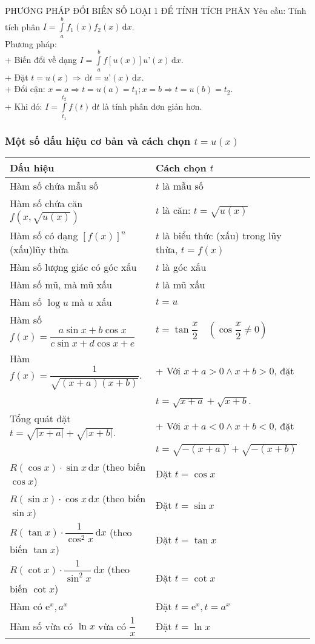 \begin{dang}{PHƯƠNG PHÁP ĐỔI BIẾN SỐ LOẠI 1 ĐỂ TÍNH TÍCH PHÂN}
	Yêu cầu: Tính tích phân $I=\displaystyle\int\limits_a^b f_1(x)f_2(x)\mathrm{\,d}x$.\\
	Phương pháp:\\
	+ Biến đổi về dạng $I=\displaystyle\int\limits_a^b f[u(x)]u’(x)\mathrm{\,d}x$.\\
	+ Đặt $t=u(x)\Rightarrow\mathrm{\,d}t=u’(x)\mathrm{\,d}x$.\\
	+ Đổi cận: $x=a\Rightarrow t=u(a)=t_1; x=b\Rightarrow t=u(b)=t_2$.\\
	+ Khi đó: $I=\displaystyle\int\limits_{t_1}^{t_2} f(t)\mathrm{\,d}t$ là tính phân đơn giản hơn.\\
	\subsubsection*{Một số dấu hiệu cơ bản và cách chọn $t=u(x)$} 
	\begin{longtable}{|l|l|}
		\hline
		\textbf{Dấu hiệu} & \textbf{Cách chọn $t$}  \\
		\hline
		Hàm số chứa mẫu số &  $t$ là mẫu số \\
		\hline
		Hàm số chứa căn $f\left(x,\sqrt{u(x)}\right)$  &  $t$ là căn: $t=\sqrt{u(x)}$  \\
		\hline
		Hàm số có dạng $[f(x)]^n$ (xấu)lũy thừa &  $t$ là biểu thức (xấu) trong lũy thừa, $t=f(x)$  \\
		\hline
		Hàm số lượng giác có góc xấu &  $t$ là góc xấu \\
		\hline
		Hàm số mũ, mà mũ xấu &  $t$ là mũ xấu \\
		\hline
		Hàm số $\log u$ mà $u$ xấu &  $t=u$  \\
		\hline
		Hàm số $f(x)=\dfrac{a\sin x+b\cos x}{c\sin x+d\cos x+e}$  &  $t=\tan\dfrac{x}{2}\quad\left(\cos\dfrac{x}{2}\neq 0\right)$  \\
		\hline
		Hàm $f(x)=\dfrac{1}{\sqrt{(x+a)(x+b)}}$.& + Với $x+a>0\wedge x+b>0$, đặt \\
		&\quad$t=\sqrt{x+a}+\sqrt{x+b}$.\\
		Tổng quát đặt $t=\sqrt{|x+a|}+\sqrt{|x+b|}$.&+ Với $x+a<0\wedge x+b<0$, đặt\\
		& \quad$t=\sqrt{-(x+a)}+\sqrt{-(x+b)}$  \\
		\hline
		$R(\cos x)\cdot\sin x\mathrm{\,d}x$ (theo biến $\cos x$) & Đặt $t=\cos x$  \\
		\hline
		$R(\sin x)\cdot\cos x\mathrm{\,d}x$ (theo biến $\sin x$) & Đặt $t=\sin x$  \\
		\hline
		$R(\tan x)\cdot\dfrac{1}{\cos^2x}\mathrm{\,d}x$ (theo biến $\tan x$) & Đặt $t=\tan x$  \\
		\hline
		$R(\cot x)\cdot\dfrac{1}{\sin^2x}\mathrm{\,d}x$ (theo biến $\cot x$) & Đặt $t=\cot x$  \\
		\hline
		Hàm có $\mathrm{e}^x, a^x$  & Đặt $t=\mathrm{e}^x, t=a^x$  \\
		\hline
		Hàm số vừa có $\ln x$ vừa có $\dfrac{1}{x}$  & Đặt $t=\ln x$  \\
		\hline
	\end{longtable}	
\end{dang}
